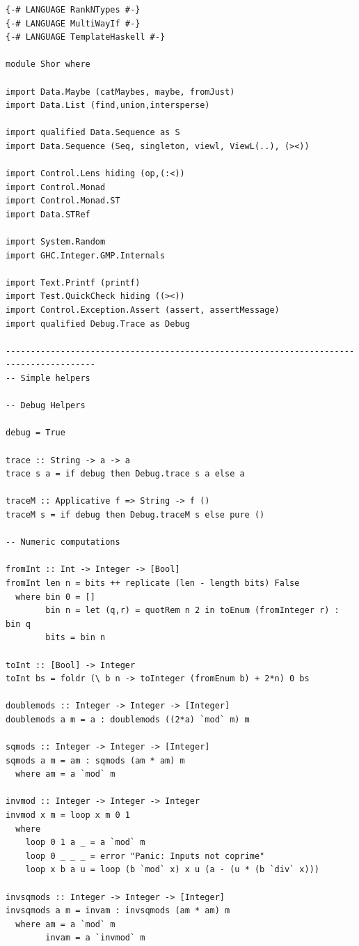 \documentclass{article}
\begin{document}
\begin{verbatim}
{-# LANGUAGE RankNTypes #-}
{-# LANGUAGE MultiWayIf #-}
{-# LANGUAGE TemplateHaskell #-}

module Shor where

import Data.Maybe (catMaybes, maybe, fromJust)
import Data.List (find,union,intersperse)

import qualified Data.Sequence as S
import Data.Sequence (Seq, singleton, viewl, ViewL(..), (><))

import Control.Lens hiding (op,(:<))
import Control.Monad 
import Control.Monad.ST
import Data.STRef

import System.Random
import GHC.Integer.GMP.Internals
  
import Text.Printf (printf)
import Test.QuickCheck hiding ((><))
import Control.Exception.Assert (assert, assertMessage)
import qualified Debug.Trace as Debug

----------------------------------------------------------------------------------------
-- Simple helpers

-- Debug Helpers

debug = True

trace :: String -> a -> a
trace s a = if debug then Debug.trace s a else a

traceM :: Applicative f => String -> f ()
traceM s = if debug then Debug.traceM s else pure ()

-- Numeric computations

fromInt :: Int -> Integer -> [Bool]
fromInt len n = bits ++ replicate (len - length bits) False 
  where bin 0 = []
        bin n = let (q,r) = quotRem n 2 in toEnum (fromInteger r) : bin q
        bits = bin n

toInt :: [Bool] -> Integer
toInt bs = foldr (\ b n -> toInteger (fromEnum b) + 2*n) 0 bs

doublemods :: Integer -> Integer -> [Integer]
doublemods a m = a : doublemods ((2*a) `mod` m) m

sqmods :: Integer -> Integer -> [Integer]
sqmods a m = am : sqmods (am * am) m
  where am = a `mod` m

invmod :: Integer -> Integer -> Integer
invmod x m = loop x m 0 1
  where
    loop 0 1 a _ = a `mod` m
    loop 0 _ _ _ = error "Panic: Inputs not coprime"
    loop x b a u = loop (b `mod` x) x u (a - (u * (b `div` x)))

invsqmods :: Integer -> Integer -> [Integer]
invsqmods a m = invam : invsqmods (am * am) m
  where am = a `mod` m
        invam = a `invmod` m 


\end{verbatim}
\end{document}
